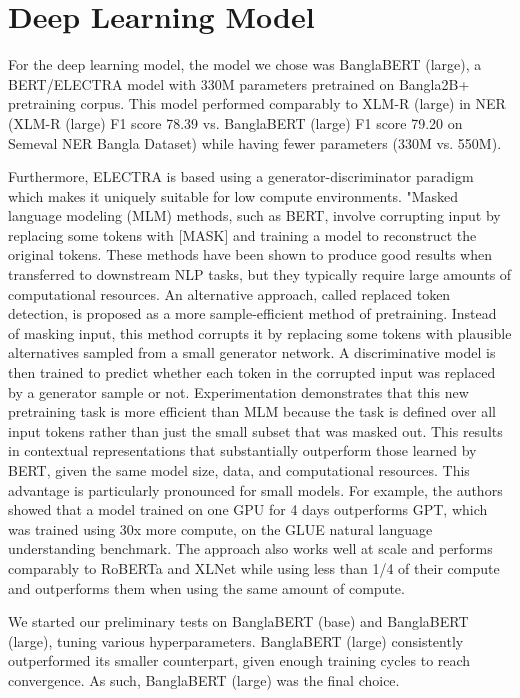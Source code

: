 \documentclass{article}
\begin{document}
\section{Deep Learning Model}
\label{sec:deep_learning_model}

For the deep learning model, the model we chose was BanglaBERT (large), a BERT/ELECTRA model with 330M parameters pretrained on Bangla2B+ pretraining corpus. This model performed comparably to XLM-R (large) in NER (XLM-R (large) F1 score 78.39 vs. BanglaBERT (large) F1 score 79.20 on Semeval NER Bangla Dataset) while having fewer parameters (330M vs. 550M).

Furthermore, ELECTRA\cite{clark2020electra} is based using a generator-discriminator paradigm which makes it uniquely suitable for low compute environments. "Masked language modeling (MLM) methods, such as BERT, involve corrupting input by replacing some tokens with [MASK] and training a model to reconstruct the original tokens. These methods have been shown to produce good results when transferred to downstream NLP tasks, but they typically require large amounts of computational resources. An alternative approach, called replaced token detection, is proposed as a more sample-efficient method of pretraining. Instead of masking input, this method corrupts it by replacing some tokens with plausible alternatives sampled from a small generator network. A discriminative model is then trained to predict whether each token in the corrupted input was replaced by a generator sample or not. Experimentation demonstrates that this new pretraining task is more efficient than MLM because the task is defined over all input tokens rather than just the small subset that was masked out. This results in contextual representations that substantially outperform those learned by BERT, given the same model size, data, and computational resources. This advantage is particularly pronounced for small models. For example, the authors \cite{clark2020electra} showed that a model trained on one GPU for 4 days outperforms GPT, which was trained using 30x more compute, on the GLUE natural language understanding benchmark. The approach also works well at scale and performs comparably to RoBERTa and XLNet while using less than 1/4 of their compute and outperforms them when using the same amount of compute.

We started our preliminary tests on BanglaBERT (base) and BanglaBERT (large), tuning various hyperparameters. BanglaBERT (large) consistently outperformed its smaller counterpart, given enough training cycles to reach convergence. As such, BanglaBERT (large) was the final choice.
\end{document}
